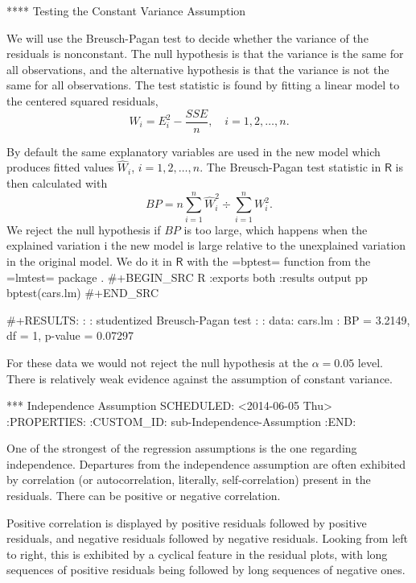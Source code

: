 **** Testing the Constant Variance Assumption

We will use the Breusch-Pagan test to decide whether the variance of
the residuals is nonconstant. The null hypothesis is that the variance
is the same for all observations, and the alternative hypothesis is
that the variance is not the same for all observations. The test
statistic is found by fitting a linear model to the centered squared
residuals,
\begin{equation}
W_{i} = E_{i}^{2} - \frac{SSE}{n}, \quad i=1,2,\ldots,n.
\end{equation}

By default the same explanatory variables are used in the new model
which produces fitted values \(\hat{W}_{i}\), \(i=1,2,\ldots,n\). The
Breusch-Pagan test statistic in \(\mathsf{R}\) is then calculated with
\begin{equation}
BP=n\sum_{i=1}^{n}\hat{W}_{i}^{2}\div\sum_{i=1}^{n}W_{i}^{2}.
\end{equation}
We reject the null hypothesis if \(BP\) is too large, which happens
when the explained variation i the new model is large relative to the
unexplained variation in the original model.  We do it in
\(\mathsf{R}\) with the =bptest= function from the =lmtest= package
\cite{lmtest}.
#+BEGIN_SRC R :exports both :results output pp
bptest(cars.lm)
#+END_SRC

#+RESULTS:
: 
: 	studentized Breusch-Pagan test
: 
: data:  cars.lm
: BP = 3.2149, df = 1, p-value = 0.07297

For these data we would not reject the null hypothesis at the
\(\alpha=0.05\) level. There is relatively weak evidence against the
assumption of constant variance.

*** Independence Assumption
    SCHEDULED: <2014-06-05 Thu>
:PROPERTIES:
:CUSTOM_ID: sub-Independence-Assumption
:END:

One of the strongest of the regression assumptions is the one
regarding independence. Departures from the independence assumption
are often exhibited by correlation (or autocorrelation, literally,
self-correlation) present in the residuals. There can be positive or
negative correlation.

Positive correlation is displayed by positive residuals followed by
positive residuals, and negative residuals followed by negative
residuals. Looking from left to right, this is exhibited by a cyclical
feature in the residual plots, with long sequences of positive
residuals being followed by long sequences of negative ones.

